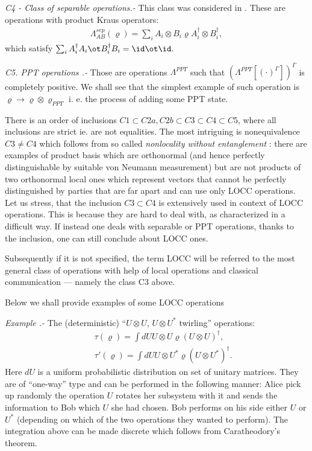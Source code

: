 \documentclass[twocolumn,aps,rmp]{revtex4}
\begin{document}
{\it C4 - Class of separable operations.-} This class was considered
in \cite{PlenioVedral1998,RainsSep}. These are operations with product
Kraus operators:
\begin{eqnarray}
\Lambda^{sep}_{AB}(\varrho)=\sum_{i} A_{i} \otimes B_{i} \varrho
A_{i}^{\dagger} \otimes B_{i}^{\dagger}, \label{Separable}
\end{eqnarray}
which satisfy $\sum_i A_{i}^{\dagger} A_{i}\ot B_{i}^{\dagger} B_{i} = \id\ot\id.$

{\it C5. PPT operations .-} Those are operations
\cite{Rains1999,Rains-erratum1999} $\Lambda^{PPT}$ such that $
(\Lambda^{PPT}[(\cdot)^{\Gamma}])^{\Gamma}$ is completely positive. We
shall see that the simplest example of such operation is $\varrho
\rightarrow \varrho \otimes \varrho_{PPT}$ i. e. the process of adding
some PPT state.

There is an order of inclusions $C1 \subset C2a,C2b \subset C3 \subset
C4 \subset C5$, where all inclusions are strict ie. are not
equalities. The most intriguing is nonequivalence $C3 \neq C4$ which
follows from so called {\it nonlocality without entanglement}
\cite{Bennett-nlwe}: there are examples of product basis which are
orthonormal (and hence perfectly distinguishable by suitable von
Neumann measurement) but are not products of two orthonormal local
ones which represent vectors that cannot be perfectly distinguished by
parties that are far apart and can use only LOCC operations. Let us
stress, that the inclusion $C3 \subset C4$ is extensively used in
context of LOCC operations. This is because they are hard to deal
with, as characterized in a difficult way. If instead one deals with
separable or PPT operations, thanks to the inclusion, one can still
conclude about LOCC ones.

Subsequently if it is not specified, the term LOCC will be referred to
the most general class of operations with help of local operations and
classical communication --- namely the class C3 above.

Below we shall provide examples of some LOCC operations

{\it Example .-} The (deterministic) ``$U \otimes U$, $U \otimes
U^{*}$ twirling'' operations:
\begin{eqnarray}
&&\tau(\varrho) =\int dU U \otimes U \varrho (U \otimes U)^{\dagger}, \nonumber \\
&&\tau'(\varrho) =\int dU U \otimes U^{*} \varrho (U \otimes
U^{*})^{\dagger}.
\end{eqnarray}
Here $dU$ is a uniform probabilistic distribution on set of unitary
matrices. They are of ``one-way'' type and can be performed in the
following manner: Alice pick up randomly the operation $U$ rotates her
subsystem with it and sends the information to Bob which $U$ she had
chosen. Bob performs on his side either $U$ or $U^{*}$ (depending on
which of the two operations they wanted to perform).  The integration
above can be made discrete which follows from Caratheodory's theorem.
\end{document}
